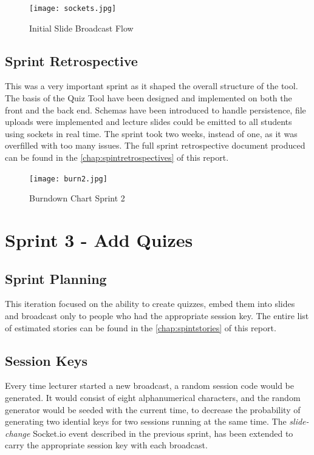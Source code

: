 \begin{figure}[h!]
    \centering
    \texttt{[image: sockets.jpg]}
    \caption{Initial Slide Broadcast Flow}
    \label{fig:sockets}
\end{figure}

\newpage
\subsection{Sprint Retrospective}
This was a very important sprint as it shaped the overall structure of the tool. The basis
of the Quiz Tool have been designed and implemented on both the front and the back end.
Schemas have been introduced to handle persistence, file uploads were implemented and
lecture slides could be emitted to all students using sockets in real time. The sprint
took two weeks, instead of one, as it was overfilled with too many issues.
The full sprint retrospective document produced can be found in the \autoref{chap:spintretrospectives} of this report.

\begin{figure}[h!]
    \centering
    \texttt{[image: burn2.jpg]}
    \caption{Burndown Chart Sprint 2}
    \label{fig:burn1}
\end{figure}

\section{Sprint 3 - Add Quizes}
\subsection{Sprint Planning}
This iteration focused on the ability to create quizzes, embed them into slides and
broadcast only to people who had the appropriate session key. The entire list of estimated stories
can be found in the \autoref{chap:spintstories} of this report.

\subsection{Session Keys}
Every time lecturer started a new broadcast, a random session code would be generated.
It would consist of eight alphanumerical characters, and the random generator would
be seeded with the current time, to decrease the probability of generating two idential
keys for two sessions running at the same time. The \textit{slide-change} Socket.io event
described in the previous sprint, has been extended to carry the appropriate session key
with each broadcast.

